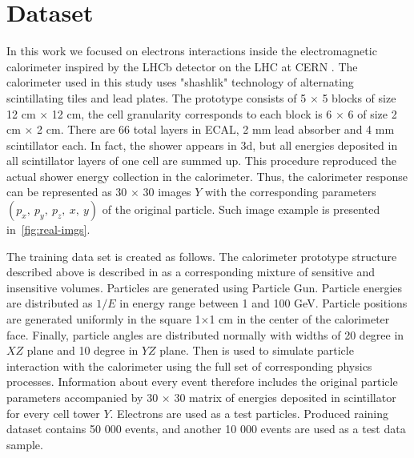 \section{Dataset}
In this work we focused on electrons interactions inside the electromagnetic calorimeter inspired by the LHCb detector on the LHC at CERN \cite{Alves:2008zz} . The calorimeter used in this study uses "shashlik" technology of alternating scintillating tiles and lead plates. The prototype  consists of 5 $\times$ 5 blocks of size 12 cm $\times$ 12 cm, the cell granularity corresponds to each block is 6 $\times$ 6 of size 2 cm $\times$ 2 cm. There are 66 total layers in ECAL, 2 mm lead absorber and 4 mm scintillator each. In fact, the shower appears in 3d, but all energies deposited in all scintillator layers of one cell are summed up. This procedure reproduced the actual shower energy collection in the calorimeter. Thus, the calorimeter response can be represented as 30 $\times$ 30 images $Y$ with the corresponding parameters $(p_x,~ p_y,~ p_z,~ x,~ y)$ of the original particle. Such image example is presented in~\cref{fig:real-imgs}.

The training data set is created as follows. The calorimeter prototype structure described above is described in \geant as a corresponding mixture of sensitive and insensitive volumes. Particles are generated using Particle Gun. Particle energies are distributed as $1/E$ in energy range between 1 and 100 GeV. Particle positions are generated uniformly in the square 1$\times$1 cm in the center of the calorimeter face. Finally, particle angles are distributed normally with widths of 20 degree in $XZ$ plane and 10 degree in $YZ$ plane. Then \geant  is used to simulate particle interaction with the calorimeter using the full set of corresponding physics processes. Information about every event therefore includes the original particle parameters accompanied by 30 $\times$ 30 matrix of energies deposited in scintillator for every cell tower $Y$. Electrons are used as a test particles. Produced raining dataset contains 50 000 events, and another 10 000 events are used as a  test data sample.
